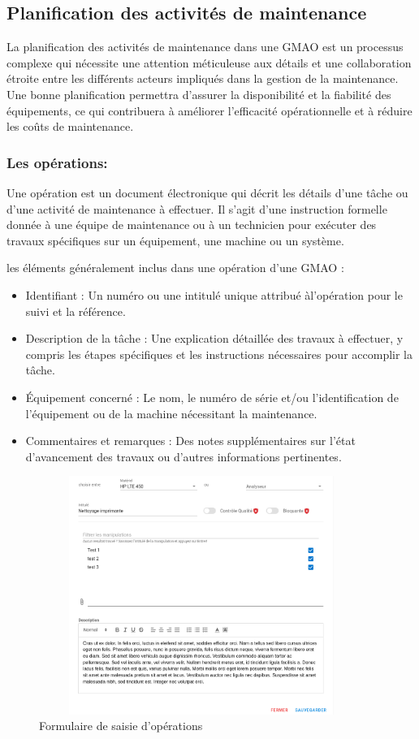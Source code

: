 \subsection{Planification des activités de maintenance}
La planification des activités de maintenance dans une GMAO est un processus complexe 
qui nécessite une attention méticuleuse aux détails et une collaboration étroite 
entre les différents acteurs impliqués dans la gestion de la maintenance. 
Une bonne planification permettra d'assurer la disponibilité et la fiabilité 
des équipements, ce qui contribuera à améliorer l'efficacité opérationnelle et 
à réduire les coûts de maintenance.
\subsubsection{Les opérations:}
Une opération est un document électronique 
qui décrit les détails d'une tâche ou d'une activité de maintenance à effectuer. 
Il s'agit d'une instruction formelle donnée à une équipe de maintenance ou 
à un technicien pour exécuter des travaux spécifiques sur un équipement, 
une machine ou un système.

les éléments généralement inclus dans une opération d'une GMAO :
\begin{itemize}
    \item Identifiant : Un numéro ou une intitulé unique attribué àl'opération pour 
    le suivi et la référence.
    \item Description de la tâche : Une explication détaillée des travaux à effectuer, 
    y compris les étapes spécifiques et les instructions nécessaires pour accomplir la 
    tâche.
    \item Équipement concerné : Le nom, le numéro de série et/ou l'identification de 
    l'équipement ou de la machine nécessitant la maintenance.
    \item Commentaires et remarques : Des notes supplémentaires sur l'état d'avancement 
    des travaux ou d'autres informations pertinentes.
\end{itemize}
\begin{figure}[hp]
    \centering
    \includegraphics[width=300pt, height=220pt]{images/operation_settings.png}
    \caption{Formulaire de saisie d'opérations}
\end{figure}

